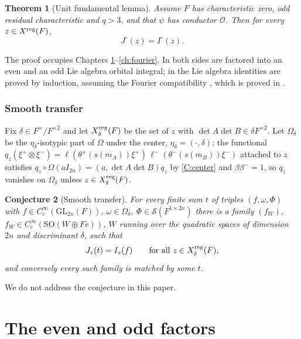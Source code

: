 \documentclass[11pt,oneside,notitlepage]{book}
\numberwithin{equation}{section}
\theoremstyle{plain}
\newtheorem{theorem}{Theorem}[section]
\newtheorem{conjecture}[theorem]{Conjecture}
\theoremstyle{definition}
\newcommand{\cO}{\mathcal{O}}
\newcommand{\GL}{\mathrm{GL}}
\newcommand{\SO}{\mathrm{SO}}
\newcommand{\cS}{\mathcal{S}}
\newcommand{\hil}[2]{(#1,#2)}
\begin{document}
\begin{theorem}[Unit fundamental lemma]\label{thm:FL}
Assume $F$ has characteristic zero, odd residual characteristic and $q>3$, and that $\psi$ has conductor $\cO$. Then for every $z\in X^{\rm reg}(F)$,
\[J^\circ(z)=I^\circ(z).\]
\end{theorem}

The proof occupies Chapters \ref{ch:decomposition}--\ref{ch:fourier}. In  both sides are factored into an even and an odd Lie algebra orbital integral; in  the Lie algebra identities are proved by induction, assuming the Fourier compatibility , which is proved in .

\subsection*{Smooth transfer}

Fix $\delta\in F^\times/F^{\times2}$ and let $X^{\rm reg}_\delta(F)$ be the set of $z$ with $\det A\det B\in\delta F^{\times2}$. Let $\Omega_\delta$ be the $\eta_\delta$-isotypic part of $\Omega$ under the center, $\eta_\delta=\hil{\cdot}{\delta}$; the functional $q_z(\xi^+\otimes\xi^-)=\ell(\theta^+(s(m_A))\xi^+)\,\ell^-(\theta^-(s(m_B))\xi^-)$ attached to $z$ satisfies $q_z\circ\Omega(aI_{2n})=\hil{a}{\det A\det B}q_z$ by \ref{C:center} and $\beta\beta^-=1$, so $q_z$ vanishes on $\Omega_\delta$ unless $z\in X^{\rm reg}_\delta(F)$.

\begin{conjecture}[Smooth transfer]\label{conj:transfer}
For every finite sum $t$ of triples $(f,\omega,\Phi)$ with $f\in C_c^\infty(\GL_{2n}(F))$, $\omega\in\Omega_\delta$, $\Phi\in\cS(F^{1\times2n})$ there is a family $(f_W)$, $f_W\in C_c^\infty(\SO(W\oplus Fe))$, $W$ running over the quadratic spaces of dimension $2n$ and discriminant $\delta$, such that
\[J_z(t)=I_z(f)\qquad\text{for all }z\in X^{\rm reg}_\delta(F),\]
and conversely every such family is matched by some $t$.
\end{conjecture}

We do not address the conjecture in this paper. 

\chapter{The even and odd factors}\label{ch:decomposition}
\end{document}
